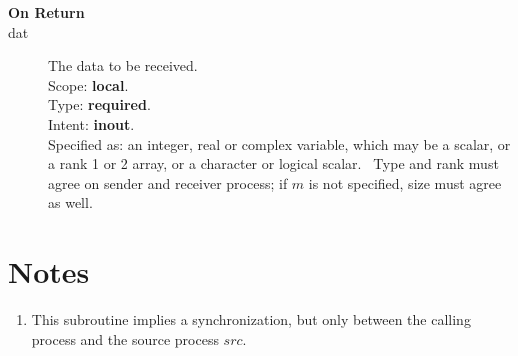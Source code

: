 \begin{description}
\item[\bf On Return]
\item[dat] The data to be received.\\
Scope: {\bf local}.\\
Type: {\bf required}.\\
Intent: {\bf inout}.\\
Specified as: an integer, real or complex variable, which may be a
scalar, or a rank 1 or 2 array, or a character or logical scalar. \
Type and  rank must agree on sender and receiver process; if $m$ is
not specified, size must agree as well. 
\end{description}

\section*{Notes}
\begin{enumerate}
\item This subroutine implies a synchronization, but only between the
  calling process and the source  process $src$.
\end{enumerate}
